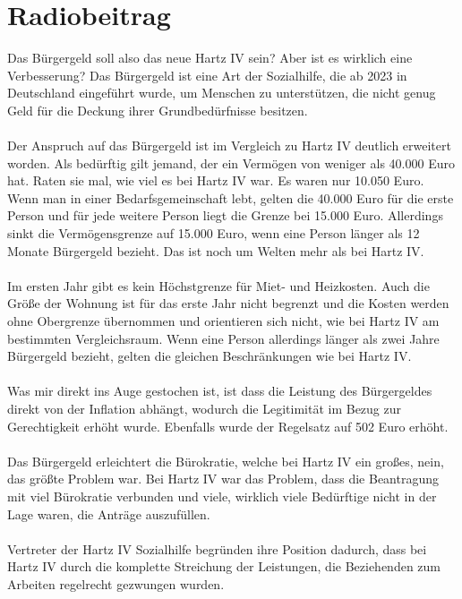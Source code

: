 \documentclass[11pt,a4paper]{article}
\begin{document}
    \section{Radiobeitrag}

    Das Bürgergeld soll also das neue Hartz IV sein?
    Aber ist es wirklich eine Verbesserung?
    Das Bürgergeld ist eine Art der Sozialhilfe, die ab 2023 in Deutschland eingeführt wurde, um Menschen zu unterstützen, die nicht genug Geld für die Deckung ihrer Grundbedürfnisse besitzen.
    \\\\
    Der Anspruch auf das Bürgergeld ist im Vergleich zu Hartz IV deutlich erweitert worden.
    Als bedürftig gilt jemand, der ein Vermögen von weniger als 40.000 Euro hat.
    Raten sie mal, wie viel es bei Hartz IV war.
    Es waren nur 10.050 Euro.
    Wenn man in einer Bedarfsgemeinschaft lebt, gelten die 40.000 Euro für die erste Person und für jede weitere Person liegt die Grenze bei 15.000 Euro.
    Allerdings sinkt die Vermögensgrenze auf 15.000 Euro, wenn eine Person länger als 12 Monate Bürgergeld bezieht.
    Das ist noch um Welten mehr als bei Hartz IV.
    \\\\
    Im ersten Jahr gibt es kein Höchstgrenze für Miet- und Heizkosten.
    Auch die Größe der Wohnung ist für das erste Jahr nicht begrenzt und die Kosten werden ohne Obergrenze übernommen und orientieren sich nicht, wie bei Hartz IV am bestimmten Vergleichsraum.
    Wenn eine Person allerdings länger als zwei Jahre Bürgergeld bezieht, gelten die gleichen Beschränkungen wie bei Hartz IV.
    \\\\
    Was mir direkt ins Auge gestochen ist, ist dass die Leistung des Bürgergeldes
    direkt von der Inflation abhängt, wodurch die Legitimität im Bezug zur Gerechtigkeit erhöht wurde.
    Ebenfalls wurde der Regelsatz auf 502 Euro erhöht.
    \\\\
    Das Bürgergeld erleichtert die Bürokratie, welche bei Hartz IV ein großes, nein, das größte Problem war.
    Bei Hartz IV war das Problem, dass die Beantragung mit viel Bürokratie verbunden und viele, wirklich viele Bedürftige nicht in der Lage waren, die Anträge auszufüllen.
    \\\\
    Vertreter der Hartz IV Sozialhilfe begründen ihre Position dadurch, dass bei Hartz IV durch die komplette Streichung der Leistungen, die Beziehenden zum Arbeiten regelrecht gezwungen wurden.
\end{document}
